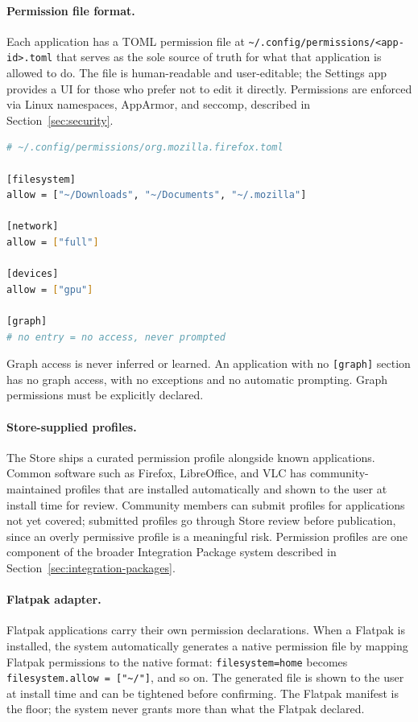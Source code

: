 \paragraph{Permission file format.}
Each application has a TOML permission file at
\texttt{\textasciitilde/.config/permissions/<app-id>.toml} that serves as the
sole source of truth for what that application is allowed to do. The file is
human-readable and user-editable; the Settings app provides a UI for those who
prefer not to edit it directly. Permissions are enforced via Linux namespaces,
AppArmor, and seccomp, described in Section~\ref{sec:security}.

\begin{lstlisting}[language=bash, caption={Example permission file}]
# ~/.config/permissions/org.mozilla.firefox.toml

[filesystem]
allow = ["~/Downloads", "~/Documents", "~/.mozilla"]

[network]
allow = ["full"]

[devices]
allow = ["gpu"]

[graph]
# no entry = no access, never prompted
\end{lstlisting}

Graph access is never inferred or learned. An application with no
\texttt{[graph]} section has no graph access, with no exceptions and no
automatic prompting. Graph permissions must be explicitly declared.

\paragraph{Store-supplied profiles.}
The Store ships a curated permission profile alongside known applications.
Common software such as Firefox, LibreOffice, and VLC has community-maintained
profiles that are installed automatically and shown to the user at install time
for review. Community members can submit profiles for applications not yet
covered; submitted profiles go through Store review before publication, since
an overly permissive profile is a meaningful risk. Permission profiles are one
component of the broader Integration Package system described in
Section~\ref{sec:integration-packages}.

\paragraph{Flatpak adapter.}
Flatpak applications carry their own permission declarations. When a Flatpak is
installed, the system automatically generates a native permission file by
mapping Flatpak permissions to the native format: \texttt{filesystem=home}
becomes \texttt{filesystem.allow = ["\textasciitilde/"]}, and so on. The
generated file is shown to the user at install time and can be tightened before
confirming. The Flatpak manifest is the floor; the system never grants more
than what the Flatpak declared.

